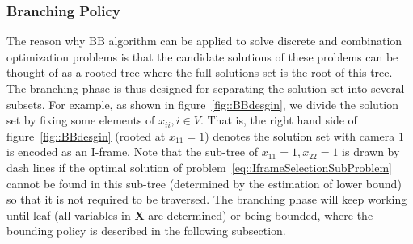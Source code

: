 \subsubsection{Branching Policy}
The reason why BB algorithm can be applied to solve discrete and combination optimization problems is that the candidate solutions of these problems can be thought of as a rooted tree where the full solutions set is the root of this tree.
The branching phase is thus designed for separating the solution set into several subsets.
For example, as shown in figure~\ref{fig::BBdesgin}, we divide the solution set by fixing some elements of ${x_{ii},i \in V}$.
That is, the right hand side of figure~\ref{fig::BBdesgin} (rooted at $x_{11}=1$) denotes the solution set with camera $1$ is encoded as an I-frame.
Note that the sub-tree of $x_{11}=1, x_{22}=1$ is drawn by dash lines if the optimal solution of problem~\eqref{eq::IframeSelectionSubProblem} cannot be found in this sub-tree (determined by the estimation of lower bound) so that it is not required to be traversed.
The branching phase will keep working until leaf (all variables in $\mathbf{X}$ are determined) or being bounded, where the bounding policy is described in the following subsection.
%
